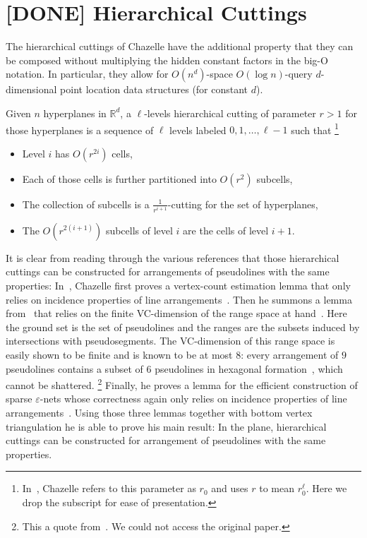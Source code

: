 \section{[DONE] Hierarchical Cuttings}%
\label{sec:divide-and-conquer:hierarchical-cuttings}

The hierarchical cuttings of Chazelle
have the additional property that they can be composed without multiplying the
hidden constant factors in the big-O notation. In particular, they allow
for \(O(n^d)\)-space \(O(\log n)\)-query \(d\)-dimensional point location data
structures (for constant \(d\)).
\ifjournal
  \begin{definition}
    Given \(n\) hyperplanes in \(\mathbb{R}^d\),
    a \(\ell\)-levels hierarchical cutting of parameter \(r > 1\)
    for those hyperplanes
    is a sequence of \(\ell\) levels labeled \(0,1, \ldots, \ell - 1\)
    such that%
    \footnote{In~\cite{C93}, Chazelle refers to this parameter as
    \(r_0\) and uses \(r\) to mean \(r_0^\ell\). Here we drop the subscript for
    ease of presentation.}
    \begin{itemize}
      \item Level \(i\) has \(O(r^{2i})\) cells,
      \item Each of those cells is further partitioned into \(O(r^2)\)
        subcells,
      \item The collection of subcells is a \(\frac{1}{r^{i+1}}\)-cutting for
        the set of hyperplanes,
      \item The \(O(r^{2(i+1)})\) subcells of level \(i\) are the cells of level \(i+1\).
    \end{itemize}
  \end{definition}
  It is clear from reading through the various references that those
  hierarchical cuttings can be constructed for arrangements of pseudolines with
  the same properties:
  In~\cite{C93},
  Chazelle first proves a vertex-count estimation lemma
  that only relies on incidence properties of line
  arrangements~\cite[Lemma~2.1]{C93}. Then he summons a lemma from~\cite{Ma93}
  that relies on the finite VC-dimension of the range space at
  hand~\cite[Lemma~3.1]{C93}.
  Here the ground set is the set of pseudolines and the ranges are the
  subsets induced by intersections with pseudosegments.
  The VC-dimension of this range space
  is easily shown to be finite and is known to be at most
  \(8\): every arrangement of \(9\) pseudolines contains a subset of
  \(6\) pseudolines in hexagonal formation~\cite{HM94}, which cannot be
  shattered.%
  \footnote{This a quote from~\cite{BMP05}. We could not access
  the original paper.}
  Finally, he proves a lemma for the efficient construction of
  sparse \(\varepsilon\)-nets whose correctness again only relies on incidence
  properties of line arrangements~\cite[Lemma 3.2]{C93}.
  Using those three lemmas together with bottom vertex triangulation he is
  able to prove his main result:
\else%
In the plane, hierarchical cuttings can be
constructed for arrangement of pseudolines with the same properties.
\fi

